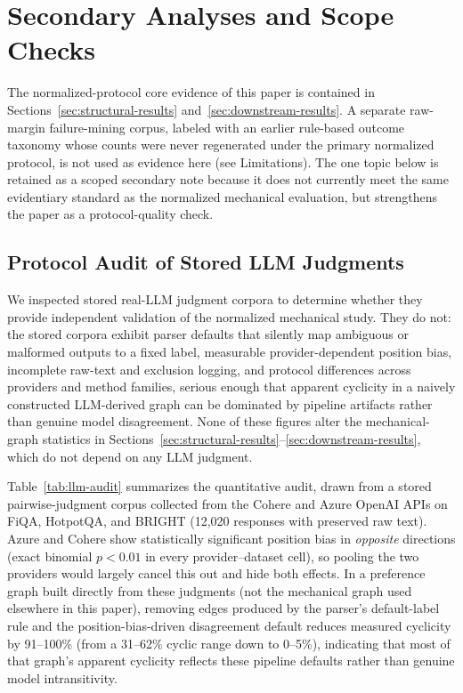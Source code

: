 \documentclass[manuscript,anonymous,review]{acmart}
\begin{document}
\section{Secondary Analyses and Scope Checks}
\label{sec:secondary-checks}

The normalized-protocol core evidence of this paper is contained in
Sections~\ref{sec:structural-results} and~\ref{sec:downstream-results}. A
separate raw-margin failure-mining corpus, labeled with an earlier rule-based
outcome taxonomy whose counts were never regenerated under the primary
normalized protocol, is not used as evidence here (see Limitations). The one
topic below is retained as a scoped secondary note because it does not
currently meet the same evidentiary standard as the normalized mechanical
evaluation, but strengthens the paper as a protocol-quality check.

\subsection{Protocol Audit of Stored LLM Judgments}
\label{sec:real-llm}

We inspected stored real-LLM judgment corpora to determine whether they
provide independent validation of the normalized mechanical study. They do
not: the stored corpora exhibit parser defaults that silently map ambiguous or
malformed outputs to a fixed label, measurable provider-dependent position
bias, incomplete raw-text and exclusion logging, and protocol differences
across providers and method families, serious enough that apparent cyclicity
in a naively constructed LLM-derived graph can be dominated by pipeline
artifacts rather than genuine model disagreement. None of these figures alter
the mechanical-graph statistics in
Sections~\ref{sec:structural-results}--\ref{sec:downstream-results}, which do
not depend on any LLM judgment.

Table~\ref{tab:llm-audit} summarizes the quantitative audit, drawn from a
stored pairwise-judgment corpus collected from the Cohere and Azure OpenAI
APIs on FiQA, HotpotQA, and BRIGHT (12{,}020 responses with preserved raw
text). Azure and Cohere show statistically significant position bias in
\emph{opposite} directions (exact binomial $p<0.01$ in every
provider--dataset cell), so pooling the two providers would largely cancel
this out and hide both effects. In a preference graph built directly from
these judgments (not the mechanical graph used elsewhere in this paper),
removing edges produced by the parser's default-label rule and the
position-bias-driven disagreement default reduces measured cyclicity by
91--100\% (from a 31--62\% cyclic range down to 0--5\%), indicating that most
of that graph's apparent cyclicity reflects these pipeline defaults rather
than genuine model intransitivity.
\end{document}
